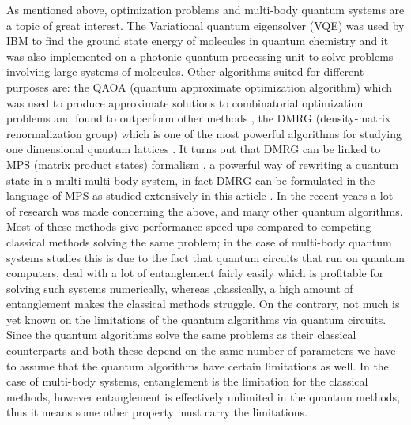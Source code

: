 \documentclass{physics_article}
\begin{document}
	As mentioned above, optimization problems and multi-body quantum systems are a topic of great interest. The Variational quantum eigensolver (VQE) was used by IBM to find the ground state energy of molecules in  quantum chemistry \cite{kandala_mezzacapo_temme_takita_brink_chow_gambetta_2017} and it was also implemented on a photonic quantum processing unit \cite{peruzzo_mcclean_shadbolt_yung_zhou_love_aspuru-guzik_obrien_2014} to solve problems involving large systems of molecules. Other algorithms suited for different purposes are: the QAOA (quantum approximate optimization algorithm) which was used to produce approximate solutions to combinatorial optimization problems \cite{https://doi.org/10.48550/arxiv.1411.4028} and found to outperform other methods \cite{PhysRevX.10.021067}, the DMRG (density-matrix renormalization group) which is one of the most powerful algorithms for studying one dimensional quantum lattices \cite{schollwock_2005,hallberg_2006}. It turns out that DMRG can be linked to MPS (matrix product states) formalism \cite{https://doi.org/10.48550/arxiv.quant-ph/0608197}, a powerful way of rewriting a quantum state in a multi multi body system, in fact DMRG can be formulated in the language of MPS as studied extensively in this article \cite{schollwock_2011}. In the recent years a lot of research was made concerning the above, and many other quantum algorithms. Most of these methods give performance speed-ups compared to competing classical methods solving the same problem; in the case of multi-body quantum systems studies this is due to the fact that quantum circuits that run on quantum computers, deal with a lot of entanglement fairly easily which is profitable for solving such systems numerically, whereas ,classically, a high amount of entanglement makes the classical methods struggle. On the contrary, not much is yet known on the limitations of the quantum algorithms via quantum circuits. Since the quantum algorithms solve the same problems as their classical counterparts and both these depend on the same number of parameters we have to assume that the quantum algorithms have certain limitations as well. In the case of multi-body systems, entanglement is the limitation for the classical methods, however entanglement is effectively unlimited in the quantum methods, thus it means some other property must carry the limitations.  
\end{document}
